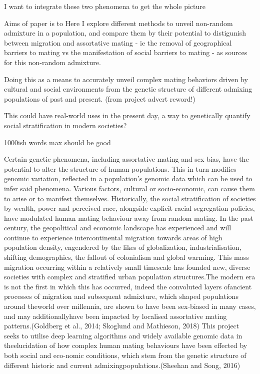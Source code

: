 \documentclass[11pt]{article}
\begin{document}
I want to integrate these two phenomena to get the whole picture


Aims of paper is to 
Here I explore different methods to unveil non-random admixture in a population, and compare them by their potential to distigunish between migration and assortative mating - ie the removal of geographical barriers to mating vs the manifestation of social barriers to mating - as sources for this non-random admixture.

Doing this as a means to accurately unveil complex mating behaviors driven by cultural and social environments from the genetic structure of different admixing populations of past and present. (from project advert reword!)

This could have real-world uses in the present day, a way to genetically quantify social stratification in modern societies?






1000ish words max should be good


Certain genetic phenomena, including assortative mating and sex bias, have the potential to alter the structure of human populations.  This in turn modifies genomic variation, reflected in a population’s genomic data which can be used to infer said phenomena.  Various factors,  cultural or socio-economic, can cause them to arise or to manifest themselves.  Historically, the social stratification of societies by wealth, power and perceived race, alongside explicit racial segregation policies, have modulated human mating behaviour away from random mating. In  the  past  century,  the geopolitical  and  economic  landscape  has  experienced  and  will  continue to experience intercontinental migration towards areas of high population density, engendered by the  likes  of  globalization,  industrialisation,  shifting  demographics,  the  fallout  of  colonialism  and global  warming.   This  mass  migration  occurring  within  a  relatively  small  timescale  has  founded new, diverse societies with complex and stratified urban population structures.The  modern  era  is  not  the  first  in  which  this  has  occurred,  indeed  the  convoluted  layers  ofancient processes of migration and subsequent admixture,  which shaped populations around theworld  over  millennia,  are  shown  to  have  been  sex-biased  in  many  cases,  and  may  additionallyhave been impacted by localised assortative mating patterns.(Goldberg et al., 2014; Skoglund and Mathieson, 2018) This project seeks to utilise deep learning algorithms and widely available genomic data in theelucidation of how complex human mating behaviours have been effected by both social and eco-nomic conditions, which stem from the genetic structure of different historic and current admixingpopulations.(Sheehan and Song, 2016)
\end{document}

